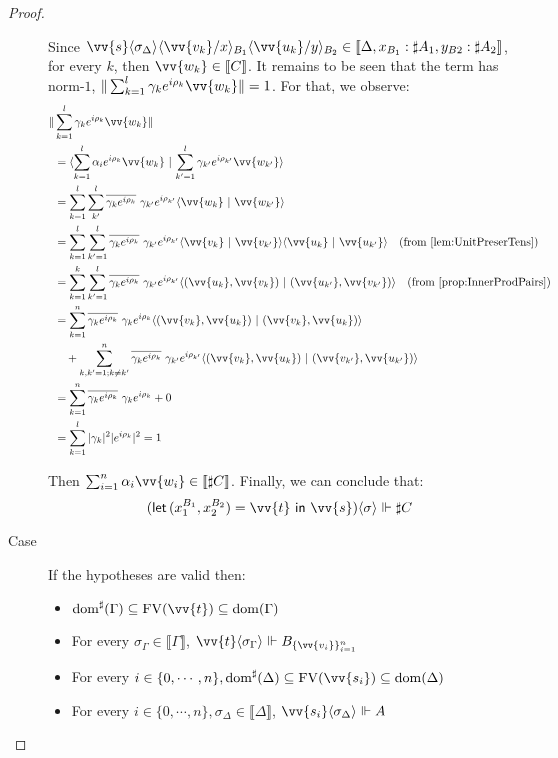 \documentclass[runningheads,orivec,envcountsame,envcountsect]{llncs}
\newcommand\ansubst[2]{\ensuremath{\langle #1 \rangle_{#2}}}
\newcommand\dom[1]{\mathrm{dom}(#1)}
\newcommand\sdom[1]{\mathrm{dom}^{\sharp}(#1)}
\newcommand\FV[1]{\mathrm{FV}(#1)}
\def\scal#1#2{\langle{#1}~|~{#2}\rangle}
\def\Pair#1#2{(#1,#2)} %
\def\letkeyword{\mathsf{let}}
\def\inkeyword{\mathsf{in}}
\def\LetP#1#2#3#4#5#6{\letkeyword\,\Pair{#1^{#2}}{#3^{#4}}=#5~\inkeyword~#6}
\def\sem#1{\llbracket#1\rrbracket}
\def\real{\Vdash}
\newcommand\genbasis[3]{\ensuremath{B_{\{#1\}_{#2}^{#3}}}}
\begin{document}
\begin{proof}
\begin{description}
    Since $\vv{s}\ansubst{\sigma_\Delta}{}\ansubst{\vv{v_k}/x}{B_1}\ansubst{\vv{u_k}/y}{B_2}\in\sem{\Delta, x_{B_1}:\sharp A_1, y_{B2}:\sharp A_2}$, for every $k$, then $\vv{w_k}\in\sem{C}$. It remains to be seen that the term has norm-$1$, $\|\sum_{k=1}^{l}\gamma_k e^{i\rho_k} \vv{w_k}\|=1$. For that, we observe:
    \begin{align*}
        \|&\sum_{k=1}^{l}\gamma_k e^{i\rho_k} \vv{w_k}\| \\
        &= \scal{\sum_{k=1}^{l}\alpha_i e^{i\rho_k} \vv{w_k}}{\sum_{k'=1}^{l}\gamma_{k'} e^{i\rho_{k'}} \vv{w_{k'}}}\\
        &= \sum_{k=1}^{l}\sum_{k'}^{l}\overline{\gamma_k e^{i\rho_k}}\  \gamma_{k'} e^{i\rho_{k'}}\scal{\vv{w_k}}{\vv{w_{k'}}}\\
        &=\sum_{k=1}^{l}\sum_{k'=1}^{l}\overline{\gamma_k e^{i\rho_k}}\ \gamma_{k'} e^{i\rho_{k'}} \scal{\vv{v_k}}{\vv{v_{k'}}}\scal{\vv{u_k}}{\vv{u_{k'}}}\quad(\text{from \Cref{lem:UnitPreserTens}})\\
        &= \sum_{k=1}^{k}\sum_{k'=1}^{l}\overline{\gamma_k e^{i\rho_k}}\  \gamma_{k'} e^{i\rho_{k'}} \scal{\Pair{\vv{u_k}}{\vv{v_k}}}{\Pair{\vv{u_{k'}}}{\vv{v_{k'}}}}\quad(\text{from \Cref{prop:InnerProdPairs}})\\
        &=\sum_{k=1}^n \overline{\gamma_k e^{i\rho_k}}\ \gamma_k e^{i\rho_k} \scal{\Pair{\vv{v_k}}{\vv{u_k}}}{\Pair{\vv{v_k}}{\vv{u_k}}} \\
        & \quad + \sum_{k,k'=1; k\neq k'}^n \overline{\gamma_k e^{i\rho_k}}\  \gamma_{k'} e^{i\rho_{k'}} \scal{\Pair{\vv{v_k}}{\vv{u_k}}}{\Pair{\vv{v_{k'}}}{\vv{u_{k'}}}}\\
        &= \sum_{k=1}^n \overline{\gamma_k e^{i\rho_k}}\ \gamma_k e^{i\rho_k} + 0 \\
        &= \sum_{k=1}^{l} |\gamma_k|^2 |e^{i\rho_k}|^2 = 1
    \end{align*}

    Then $\sum_{i=1}^{n}\alpha_i\vv{w_i}\in\sem{\sharp C}$. Finally, we can conclude that: 
    \[(\LetP{x_1}{B_1}{x_2}{B_2}{\vv{t}}{\vv{s}})\ansubst{\sigma}{}\real{\sharp C}\]

    \item[Case] If the hypotheses are valid then:
    \begin{itemize}
        \item $\sdom{\Gamma}\subseteq \FV{\vv{t}}\subseteq \dom{\Gamma}$
        \item For every $\sigma_\Gamma\in\sem{\Gamma}$, $\vv{t}\ansubst{\sigma_\Gamma}{}\real\genbasis{\vv{v_i}}{i=1}{n}$
        \item For every $i\in\{0,\dotsb ,n\}, \sdom{\Delta}\subseteq \FV{\vv{s_i}}\subseteq \dom{\Delta}$
        \item For every $i\in\{0,\dotsb ,n\}, \sigma_\Delta\in\sem{\Delta}$, $\vv{s_i}\ansubst{\sigma_\Delta}{}\real A$
    \end{itemize}


\end{description}
\end{proof}
\end{document}
